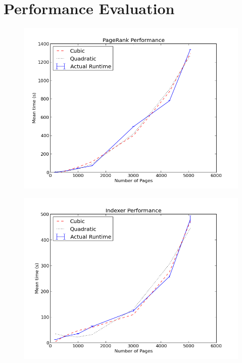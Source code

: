 \documentclass[12pt,notitlepage,twoside]{scrreprt}
\begin{document}
\section{Performance Evaluation}
\begin{figure}[h!]
  \centering
    \includegraphics[width=\linewidth]{figs/pr.png}
    \caption{}
    \label{pr}
\end{figure}

\begin{figure}[h!]
  \centering
    \includegraphics[width=\linewidth]{figs/ind.png}
    \caption{}
    \label{pr}
\end{figure}



\cleardoublepage
\end{document}
